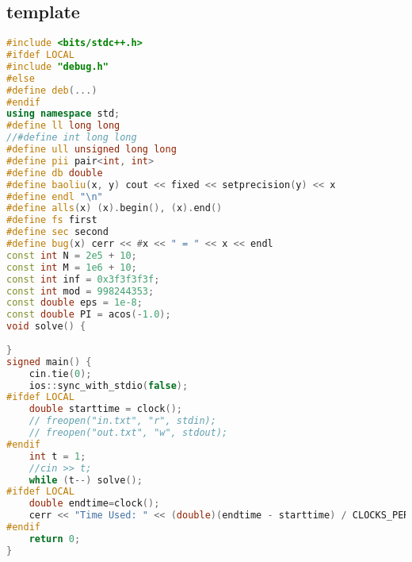 \subsection{template}
\begin{lstlisting}[language=C++]
#include <bits/stdc++.h>
#ifdef LOCAL
#include "debug.h"
#else
#define deb(...) 
#endif
using namespace std;
#define ll long long
//#define int long long
#define ull unsigned long long
#define pii pair<int, int>
#define db double
#define baoliu(x, y) cout << fixed << setprecision(y) << x
#define endl "\n"
#define alls(x) (x).begin(), (x).end()
#define fs first
#define sec second
#define bug(x) cerr << #x << " = " << x << endl
const int N = 2e5 + 10;
const int M = 1e6 + 10;
const int inf = 0x3f3f3f3f;
const int mod = 998244353;
const double eps = 1e-8;
const double PI = acos(-1.0);
void solve() {
    
}
signed main() {
    cin.tie(0);
    ios::sync_with_stdio(false);
#ifdef LOCAL
    double starttime = clock();
    // freopen("in.txt", "r", stdin);
    // freopen("out.txt", "w", stdout);
#endif
    int t = 1;
    //cin >> t;
    while (t--) solve();
#ifdef LOCAL
    double endtime=clock();
    cerr << "Time Used: " << (double)(endtime - starttime) / CLOCKS_PER_SEC * 1000 << " ms" << endl;
#endif
    return 0;
}
\end{lstlisting}
